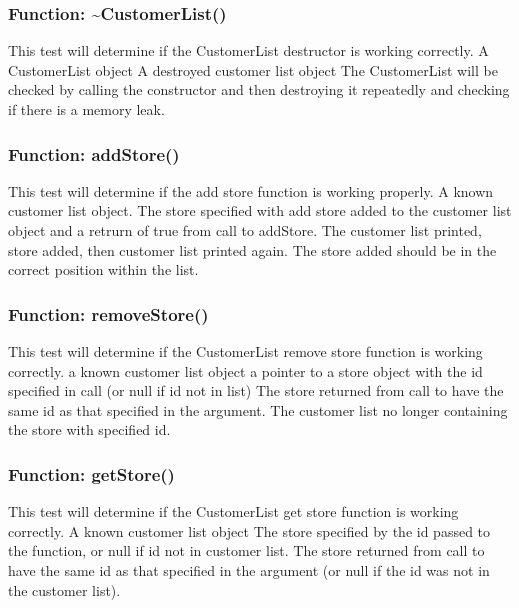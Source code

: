 \documentclass[12pt]{article}%
\newcounter{subsubsubsection}[subsubsection]
\begin{document}
\subsubsection{Function: \textasciitilde CustomerList()}
This test will determine if the CustomerList destructor is working correctly.
A CustomerList object
A destroyed customer list object
The CustomerList will be checked by calling the constructor and then destroying it repeatedly and
checking if there is a memory leak.

\subsubsection{Function: addStore()}
This test will determine if the add store function is working properly.
A known customer list object.
The store specified with add store added to the customer list object and a retrurn of true from
call to addStore.
The customer list printed, store added, then customer list printed again. The store added should be
in the correct position within the list.

\subsubsection{Function: removeStore()}
This test will determine if the CustomerList remove store function is working correctly.
a known customer list object
a pointer to a store object with the id specified in call (or null if id not in list)
The store returned from call to have the same id as that specified in the argument. The
customer list no longer containing the store with specified id.

\subsubsection{Function: getStore()}
This test will determine if the CustomerList get store function is working correctly.
A known customer list object
The store specified by the id passed to the function, or null if id not in customer list.
The store returned from call to have the same id as that specified in the argument (or null
if the id was not in the customer list).
\end{document}
